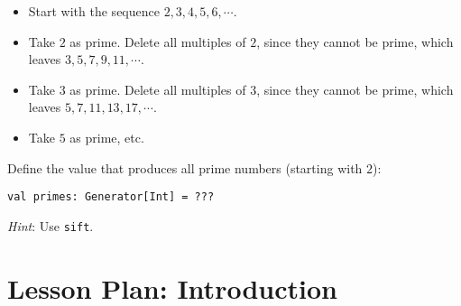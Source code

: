 \documentclass[9pt]{extbook}
\begin{document}
\begin{enumerate}
\begin{itemize}

\item Start with the sequence $2, 3, 4, 5, 6, \cdots$.

\item Take $2$ as prime. Delete all multiples of $2$, since they cannot be prime, which leaves $3, 5, 7, 9, 11, \cdots$.

\item Take $3$ as prime. Delete all multiples of $3$, since they cannot be prime, which leaves $5, 7, 11, 13, 17, \cdots$.

\item Take $5$ as prime, etc.

\end{itemize}

Define the value that produces all prime numbers (starting with $2$):

\begin{lstlisting}
val primes: Generator[Int] = ???
\end{lstlisting}

\emph{Hint}: Use \lstinline|sift|.

\end{enumerate}



\appendix

\chapter{Lesson Plan: Introduction}
\end{document}
